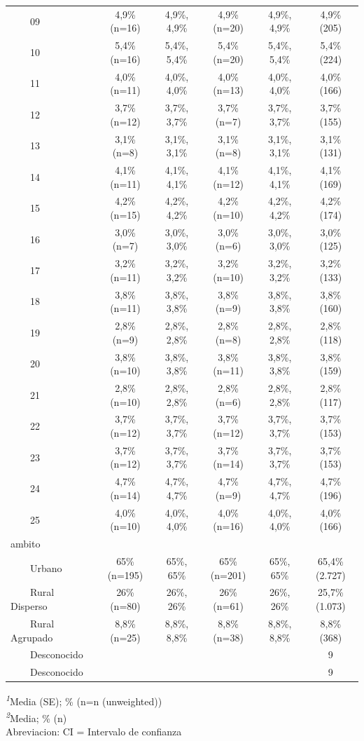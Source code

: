 \documentclass[
  spanish,
  a4paper,
]{scrreprt}
\begin{document}
\begin{table}
{\begin{tabular*}{\linewidth}{@{\extracolsep{\fill}}lccccc}
    09 & 4,9\% (n=16) & 4,9\%, 4,9\% & 4,9\% (n=20) & 4,9\%, 4,9\% & 4,9\% (205) \\ 
    10 & 5,4\% (n=16) & 5,4\%, 5,4\% & 5,4\% (n=20) & 5,4\%, 5,4\% & 5,4\% (224) \\ 
    11 & 4,0\% (n=11) & 4,0\%, 4,0\% & 4,0\% (n=13) & 4,0\%, 4,0\% & 4,0\% (166) \\ 
    12 & 3,7\% (n=12) & 3,7\%, 3,7\% & 3,7\% (n=7) & 3,7\%, 3,7\% & 3,7\% (155) \\ 
    13 & 3,1\% (n=8) & 3,1\%, 3,1\% & 3,1\% (n=8) & 3,1\%, 3,1\% & 3,1\% (131) \\ 
    14 & 4,1\% (n=11) & 4,1\%, 4,1\% & 4,1\% (n=12) & 4,1\%, 4,1\% & 4,1\% (169) \\ 
    15 & 4,2\% (n=15) & 4,2\%, 4,2\% & 4,2\% (n=10) & 4,2\%, 4,2\% & 4,2\% (174) \\ 
    16 & 3,0\% (n=7) & 3,0\%, 3,0\% & 3,0\% (n=6) & 3,0\%, 3,0\% & 3,0\% (125) \\ 
    17 & 3,2\% (n=11) & 3,2\%, 3,2\% & 3,2\% (n=10) & 3,2\%, 3,2\% & 3,2\% (133) \\ 
    18 & 3,8\% (n=11) & 3,8\%, 3,8\% & 3,8\% (n=9) & 3,8\%, 3,8\% & 3,8\% (160) \\ 
    19 & 2,8\% (n=9) & 2,8\%, 2,8\% & 2,8\% (n=8) & 2,8\%, 2,8\% & 2,8\% (118) \\ 
    20 & 3,8\% (n=10) & 3,8\%, 3,8\% & 3,8\% (n=11) & 3,8\%, 3,8\% & 3,8\% (159) \\ 
    21 & 2,8\% (n=10) & 2,8\%, 2,8\% & 2,8\% (n=6) & 2,8\%, 2,8\% & 2,8\% (117) \\ 
    22 & 3,7\% (n=12) & 3,7\%, 3,7\% & 3,7\% (n=12) & 3,7\%, 3,7\% & 3,7\% (153) \\ 
    23 & 3,7\% (n=12) & 3,7\%, 3,7\% & 3,7\% (n=14) & 3,7\%, 3,7\% & 3,7\% (153) \\ 
    24 & 4,7\% (n=14) & 4,7\%, 4,7\% & 4,7\% (n=9) & 4,7\%, 4,7\% & 4,7\% (196) \\ 
    25 & 4,0\% (n=10) & 4,0\%, 4,0\% & 4,0\% (n=16) & 4,0\%, 4,0\% & 4,0\% (166) \\ 
ambito &  &  &  &  &  \\ 
    Urbano & 65\% (n=195) & 65\%, 65\% & 65\% (n=201) & 65\%, 65\% & 65,4\% (2.727) \\ 
    Rural Disperso & 26\% (n=80) & 26\%, 26\% & 26\% (n=61) & 26\%, 26\% & 25,7\% (1.073) \\ 
    Rural Agrupado & 8,8\% (n=25) & 8,8\%, 8,8\% & 8,8\% (n=38) & 8,8\%, 8,8\% & 8,8\% (368) \\ 
    Desconocido &  &  &  &  & 9 \\ 
    Desconocido &  &  &  &  & 9 \\ 
\bottomrule
\end{tabular*}
\begin{minipage}{\linewidth}
\textsuperscript{\textit{1}}Media (SE); \% (n=n (unweighted))\\
\textsuperscript{\textit{2}}Media; \% (n)\\
Abreviacion: CI = Intervalo de confianza\\
\end{minipage}

}
\end{table}
\end{document}
